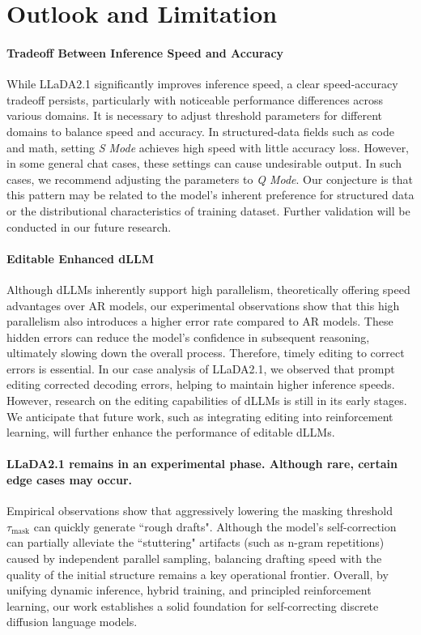 \section{Outlook and Limitation}


\paragraph{Tradeoff Between Inference Speed and Accuracy}  
While LLaDA2.1 significantly improves inference speed, a clear speed-accuracy tradeoff persists, particularly with noticeable performance differences across various domains. It is necessary to adjust threshold parameters for different domains to balance speed and accuracy. In structured-data fields such as code and math, setting \textit{S Mode} achieves high speed with little accuracy loss. However, in some general chat cases, these settings can cause undesirable output. In such cases, we recommend adjusting the parameters to \textit{Q Mode}. Our conjecture is that this pattern may be related to the model's inherent preference for structured data or the distributional characteristics of training dataset. Further validation will be conducted in our future research.


\paragraph{Editable Enhanced dLLM}
Although dLLMs inherently support high parallelism, theoretically offering speed advantages over AR models, our experimental observations show that this high parallelism also introduces a higher error rate compared to AR models. These hidden errors can reduce the model’s confidence in subsequent reasoning, ultimately slowing down the overall process. Therefore, timely editing to correct errors is essential. In our case analysis of LLaDA2.1, we observed that prompt editing corrected decoding errors, helping to maintain higher inference speeds. However, research on the editing capabilities of dLLMs is still in its early stages. We anticipate that future work, such as integrating editing into reinforcement learning, will further enhance the performance of editable dLLMs.

\paragraph{LLaDA2.1 remains in an experimental phase. Although rare, certain edge cases may occur.} Empirical observations show that aggressively lowering the masking threshold $\tau_{\text{mask}}$ can quickly generate ``rough drafts". Although the model's self-correction can partially alleviate the ``stuttering" artifacts (such as n-gram repetitions) caused by independent parallel sampling, balancing drafting speed with the quality of the initial structure remains a key operational frontier. Overall, by unifying dynamic inference, hybrid training, and principled reinforcement learning, our work establishes a solid foundation for self-correcting discrete diffusion language models.

